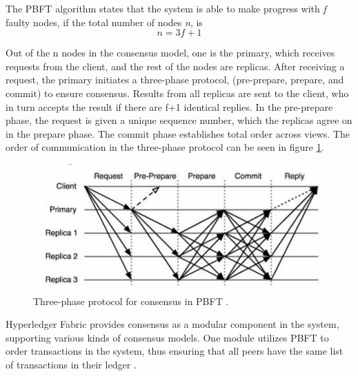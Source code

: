 The PBFT algorithm states that the system is able to make progress with \textit{f} faulty nodes, if the total number of nodes \textit{n}, is
\begin{equation*}
n = 3f + 1
\end{equation*}

Out of the n nodes in the consensus model, one is the primary, which receives requests from the client, and the rest of the nodes are replicas. After receiving a request, the primary initiates a three-phase protocol, (pre-prepare, prepare, and commit) to ensure consensus. Results from all replicas are sent to the client, who in turn accepts the result if there are f+1 identical replies. In the pre-prepare phase, the request is given a unique sequence number, which the replicas agree on in the prepare phase. The commit phase establishes total order across views. The order of communication in the three-phase protocol can be seen in figure \ref{fig:pbft}.

\begin{figure}[htb]
    \centering
    \includegraphics[width=1\textwidth]{Images/pbft}
    \caption{Three-phase protocol for consensus in PBFT \cite{pbft}.}
    \label{fig:pbft}
\end{figure}
 
Hyperledger Fabric provides consensus as a modular component in the system, supporting various kinds of consensus models. One module utilizes PBFT to order transactions in the system, thus ensuring that all peers have the same list of transactions in their ledger \cite{hyperledger, hyperledger_pbft}. 

